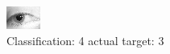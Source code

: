 \begin{figure}[h!]
\begin{center}
\includegraphics[width=0.60\columnwidth]{figures/ID1333_class_4_target_3.png}
\end{center}
\caption{ Classification: 4 actual target: 3}
\label{fig:ID1333_class_4_target_3}
\end{figure}
